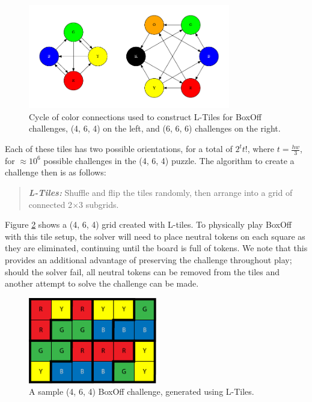 \documentclass[journal]{IEEEtran}
\begin{document}
\begin{figure}[t]
\centering
\includegraphics[width=8.8cm]{figure5.png}
\caption{Cycle of color connections used to construct L-Tiles for BoxOff challenges, (4, 6, 4) on the left, and (6, 6, 6) challenges on the right.}
\label{fig:boxoffcycle}
\end{figure}

Each of these tiles has two possible orientations, for a total of $2^{t}t!$, where $t=\frac{hw}{3}$, for $\approx 10^{6}$ possible challenges in the (4, 6, 4) puzzle. 
The algorithm to create a challenge then is as follows:

\begin{quote}
    {\it \bf L-Tiles:} Shuffle and flip the tiles randomly, then arrange into a grid of connected 2$\times$3 subgrids. 
\end{quote}

Figure \ref{fig:boxofftiles} shows a (4, 6, 4) grid created with L-tiles. To physically play BoxOff with this tile setup, the solver will need to place neutral tokens on each square as they are eliminated, continuing until the board is full of tokens. We note that this provides an additional advantage of preserving the challenge throughout play; should the solver fail, all neutral tokens can be removed from the tiles and another attempt to solve the challenge can be made.

\begin{figure}[t]
\centering
\includegraphics[width=5.6cm]{figure6.png}
\caption{A sample (4, 6, 4) BoxOff challenge, generated using L-Tiles. }
\label{fig:boxofftiles}
\end{figure}
\end{document}
